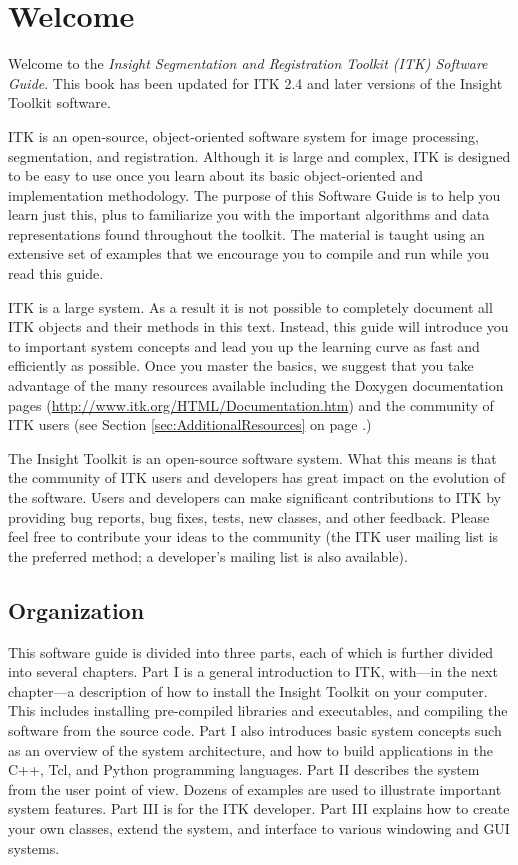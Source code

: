 \chapter{Welcome}
\label{chapter:Introduction}

Welcome to the \emph{Insight Segmentation and Registration Toolkit (ITK)
Software Guide}. This book has been updated for ITK 2.4 and later versions of
the Insight Toolkit software.

ITK is an open-source, object-oriented software system for image processing,
segmentation, and registration.  Although it is large and complex, ITK is
designed to be easy to use once you learn about its basic object-oriented and
implementation methodology. The purpose of this Software Guide is
to help you learn just this, plus to familiarize you with the important
algorithms and data representations found throughout the toolkit. The material
is taught using an extensive set of examples that we encourage you to compile
and run while you read this guide.

ITK is a large system. As a result it is not possible to completely document
all ITK objects and their methods in this text. Instead, this guide will
introduce you to important system concepts and lead you up the learning curve
as fast and efficiently as possible. Once you master the basics, we suggest
that you take advantage of the many resources available including the Doxygen
documentation pages (\url{http://www.itk.org/HTML/Documentation.htm}) and
the community of ITK users (see Section \ref{sec:AdditionalResources} on page 
\pageref{sec:AdditionalResources}.)

The Insight Toolkit is an open-source software system. What this means
is that the community of ITK users and developers has great impact on the
evolution of the software. Users and developers can make significant
contributions to ITK by providing bug reports, bug fixes, tests, new classes,
and other feedback. Please feel free to contribute your ideas to the
community (the ITK user mailing list is the preferred method; a developer's 
mailing list is also available).

\section{Organization}
\label{sec:Organization}

This software guide is divided into three parts, each of which is further
divided into several chapters. Part I is a general introduction to ITK,
with---in the next chapter---a description of how to install the Insight
Toolkit on your computer. This includes installing pre-compiled libraries and
executables, and compiling the software from the source code. Part I also
introduces basic system concepts such as an overview of the system
architecture, and how to build applications in the C++, Tcl, and Python programming
languages. Part II describes the system from the user point of view. Dozens
of examples are used to illustrate important system features. Part III is for
the ITK developer. Part III explains how to create your own classes, extend
the system, and interface to various windowing and GUI systems.


